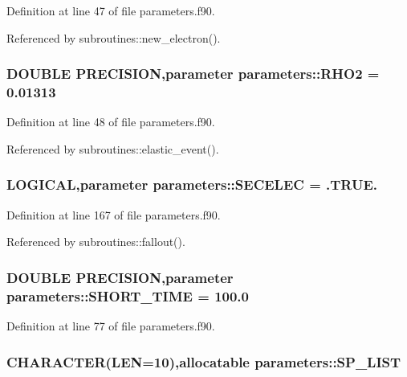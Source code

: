 Definition at line 47 of file parameters.f90.

Referenced by subroutines::new\_\-electron().\hypertarget{namespaceparameters_a79fa48b917f68e1a12577e33fd8c991c}{
\subsubsection[{RHO2}]{\setlength{\rightskip}{0pt plus 5cm}DOUBLE PRECISION,parameter {\bf parameters::RHO2} = 0.01313}}
\label{namespaceparameters_a79fa48b917f68e1a12577e33fd8c991c}


Definition at line 48 of file parameters.f90.

Referenced by subroutines::elastic\_\-event().\hypertarget{namespaceparameters_ae0f23566499e10756f5a93adb6160899}{
\subsubsection[{SECELEC}]{\setlength{\rightskip}{0pt plus 5cm}LOGICAL,parameter {\bf parameters::SECELEC} = .TRUE.}}
\label{namespaceparameters_ae0f23566499e10756f5a93adb6160899}


Definition at line 167 of file parameters.f90.

Referenced by subroutines::fallout().\hypertarget{namespaceparameters_a8b8f35affe261eb9ad1a1612ca3572a7}{
\subsubsection[{SHORT\_\-TIME}]{\setlength{\rightskip}{0pt plus 5cm}DOUBLE PRECISION,parameter {\bf parameters::SHORT\_\-TIME} = 100.0}}
\label{namespaceparameters_a8b8f35affe261eb9ad1a1612ca3572a7}


Definition at line 77 of file parameters.f90.\hypertarget{namespaceparameters_a38878c1dc241cdcfc52f1804563f7b00}{
\subsubsection[{SP\_\-LIST}]{\setlength{\rightskip}{0pt plus 5cm}CHARACTER(LEN=10),allocatable {\bf parameters::SP\_\-LIST}}}
\label{namespaceparameters_a38878c1dc241cdcfc52f1804563f7b00}



